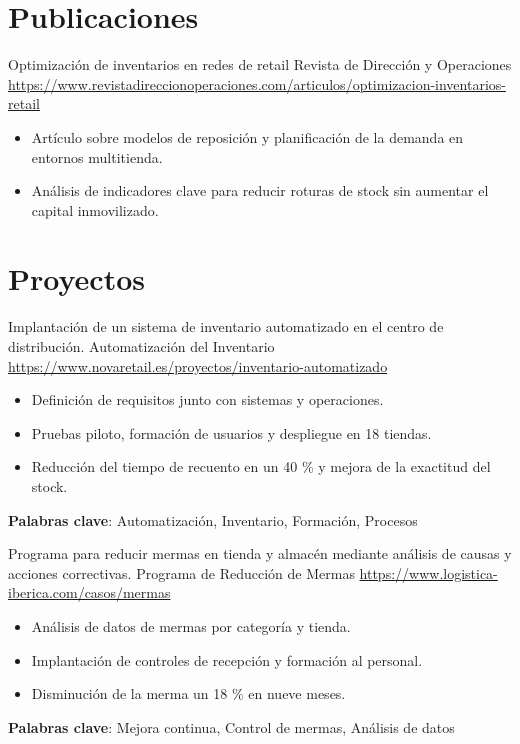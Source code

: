 \documentclass[a4paper, serif, 10pt]{moderncv}
\begin{document}
\section{Publicaciones}

        {Optimización de inventarios en redes de retail}
        {Revista de Dirección y Operaciones}
        {\url{https://www.revistadireccionoperaciones.com/articulos/optimizacion-inventarios-retail}}
        {}
        {\begin{itemize}
\item Artículo sobre modelos de reposición y planificación de la demanda en entornos multitienda.
\item Análisis de indicadores clave para reducir roturas de stock sin aumentar el capital inmovilizado.
\end{itemize}}
\section{Proyectos}

        {Implantación de un sistema de inventario automatizado en el centro de distribución.}
        {Automatización del Inventario}
        {\url{https://www.novaretail.es/proyectos/inventario-automatizado}}
        {}
        {\begin{itemize}
\item Definición de requisitos junto con sistemas y operaciones.
\item Pruebas piloto, formación de usuarios y despliegue en 18 tiendas.
\item Reducción del tiempo de recuento en un 40 \% y mejora de la exactitud del stock.
\end{itemize}
\textbf{Palabras clave}: Automatización, Inventario, Formación, Procesos}

        {Programa para reducir mermas en tienda y almacén mediante análisis de causas y acciones correctivas.}
        {Programa de Reducción de Mermas}
        {\url{https://www.logistica-iberica.com/casos/mermas}}
        {}
        {\begin{itemize}
\item Análisis de datos de mermas por categoría y tienda.
\item Implantación de controles de recepción y formación al personal.
\item Disminución de la merma un 18 \% en nueve meses.
\end{itemize}
\textbf{Palabras clave}: Mejora continua, Control de mermas, Análisis de datos}
\end{document}
